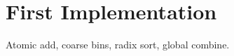 \section{First Implementation}
\label{sec:first impl}

Atomic add, coarse bins, radix sort, global combine.
